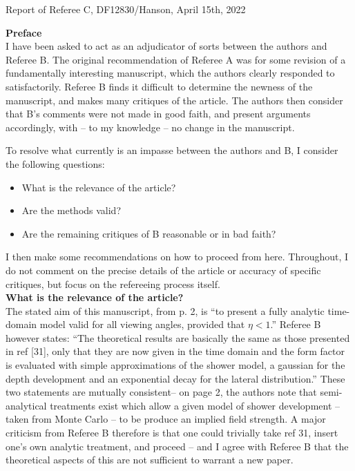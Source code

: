 \documentclass[12pt]{article}
\begin{document}
Report of Referee C, DF12830/Hanson, April 15th, 2022 \\ \vspace{0.25cm}
\hrulefill

\textbf{Preface} \\ 

I have been asked to act as an adjudicator of sorts between the authors and Referee B. The
original recommendation of Referee A was for some revision of a fundamentally interesting
manuscript, which the authors clearly responded to satisfactorily. Referee B finds it difficult
to determine the newness of the manuscript, and makes many critiques of the article. The
authors then consider that B’s comments were not made in good faith, and present
arguments accordingly, with – to my knowledge – no change in the manuscript.

To resolve what currently is an impasse between the authors and B, I consider the following
questions:

\begin{itemize}
\item What is the relevance of the article?
\item Are the methods valid?
\item Are the remaining critiques of B reasonable or in bad faith?
\end{itemize}

I then make some recommendations on how to proceed from here. Throughout, I do not comment on the precise details of the article or accuracy of specific critiques, but focus on the refereeing process itself. \\

\textbf{What is the relevance of the article?} \\

The stated aim of this manuscript, from p. 2, is ``to present a fully analytic time-domain model valid for all viewing angles, provided that $\eta < 1$.''  Referee B however states: ``The theoretical results are basically the same as those presented in ref [31], only that they are now given in the time domain and the form factor is evaluated with simple approximations of the shower model, a gaussian for the depth development and an exponential decay for the lateral distribution.''  These two statements are mutually consistent– on page 2, the authors note that semi-analytical treatments exist which allow a given model of shower development – taken from Monte Carlo – to be produce an implied field strength.  A major criticism from Referee B therefore is that one could trivially take ref 31, insert one's own analytic treatment, and proceed – and I agree with Referee B that the theoretical aspects of this are not sufficient to warrant a new paper.
\end{document}
